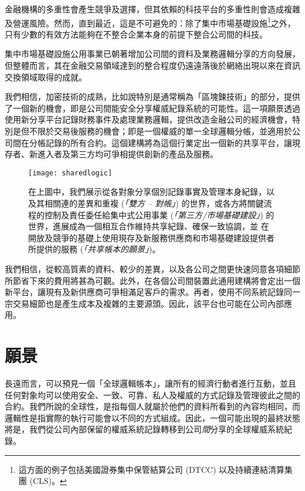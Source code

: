 \documentclass[UTF8]{ctexart}
\begin{document}
金融機構的多重性會產生競爭及選擇，但其依賴的科技平台的多重性則會造成複雜及營運風險。然而，直到最近，這是不可避免的：除了集中市場基礎設施\footnote{這方面的例子包括美國證券集中保管結算公司 (DTCC) 以及持續連結清算集團 (CLS)。}之外，只有少數的有效方法能夠在不整合企業本身的前提下整合公司間的科技。

集中市場基礎設施公用事業已朝著增加公司間的資料及業務邏輯分享的方向發展，但整體而言，其在金融交易領域達到的整合程度仍遠遠落後於網絡出現以來在資訊交換領域取得的成就。\cite{IT}

我們相信，加密技術的成熟，比如說特別是通常稱為「區塊鍊技術」的部分，提供了一個新的機會，即是公司間能安全分享權威紀錄系統的可能性。這一項願景透過使用新分享平台記錄財務事件及處理業務邏輯，提供改造金融公司的經濟機會，特別是但不限於交易後服務的機會；即是一個權威的單一全球邏輯分帳，並適用於公司間在分帳記錄的所有合約。這個建構將為這個行業定出一個新的共享平台，讓現存者、新進入者及第三方均可爭相提供創新的產品及服務。 

\begin{figure}[H]
\texttt{[image: sharedlogic]} 
\caption{在上圖中，我們展示從各對象分享個別記錄事實及管理本身紀錄，以及其相關連的差異和重複 (\textit{「雙方 – 對帳」}) 的世界，或各方將關鍵流程的控制及責任委任給集中式公用事業 (\textit{「第三方/市場基礎建設」}) 的世界，進展成為一個相互合作維持共享紀錄、確保一致協調，並 在開放及競爭的基礎上使用現存及新服務供應商和市場基礎建設提供者所提供的服務 (\textit{「共享帳本的願景」})。}
\end{figure}


我們相信，從較高質素的資料、較少的差異，以及各公司之間更快速同意各項細節所節省下來的費用將甚為可觀。此外，在各個公司間裝置此通用建構將會定出一個新平台，讓現有及新供應商可爭相滿足客戶的需求。再者，使用不同系統記錄同一宗交易細節也是產生成本及複雜的主要源頭。因此，該平台也可能在公司內部應用。

\section{願景}
長遠而言，可以預見一個「全球邏輯帳本」，讓所有的經濟行動者進行互動，並且任何對象均可以使用安全、一致、可靠、私人及權威的方式記錄及管理彼此之間的合約。我們所說的全球性，是指每個人就屬於他們的資料所看到的內容均相同，而邏輯性是指實際的執行可能會以不同的方式組成。因此，一個可能出現的最終狀態將是，我們從公司內部保留的權威系統記錄轉移到公司\textit{間}分享的全球權威系統紀錄。 
\end{document}

